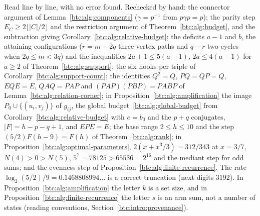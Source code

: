 \begin{writenote}
Read line by line, with no error found. Rechecked by hand: the connector
argument of Lemma~\ref{btc:alg:components} ($\gamma=p^{-1}$ from
$p\gamma p=p$); the parity step $E_C\ge2\lfloor|C|/2\rfloor$ and the
restriction argument of Theorem~\ref{btc:alg:budget}, and the subtraction
giving Corollary~\ref{btc:alg:relative-budget}; the deficits $a-1$ and $b$,
the attaining configurations ($r=m-2q$ three-vertex paths and $q-r$
two-cycles when $2q\le m<3q$) and the inequalities $2a+1\le5(a-1)$,
$2a\le4(a-1)$ for $a\ge2$ of Theorem~\ref{btc:alg:support}; the six hooks per
triple of Corollary~\ref{btc:alg:support-count}; the identities
$Q^2=Q$, $PQ=QP=Q$, $EQE=E$, $QAQ=PAP$ and $(PAP)(PBP)=PABP$ of
Lemma~\ref{btc:alg:relation-corner}; in Proposition~\ref{btc:alg:amplification}
the image $P_0\cup\{(u_i,v_j)\}$ of $g_{ij}$, the global
budget~\eqref{btc:alg:global-budget} from
Corollary~\ref{btc:alg:relative-budget} with $e=b_0$ and the $p+q$
conjugates, $|F|=h-p-q+1$, and $EPE=E$; the base range $2\le h\le10$ and the
step $(5/2)F(h-9)=F(h)$ of Theorem~\ref{btc:alg:rank}; in
Proposition~\ref{btc:alg:optimal-parameters}, $2(x+x^3/3)=312/343$ at $x=3/7$,
$N(4)>0>N(5)$, $5^7=78125>65536=2^{16}$ and the mediant step for odd sums; and
the evenness step of Proposition~\ref{btc:alg:finite-recurrence}. The rate
$\log_2(5/2)/9=0.1468808994\ldots$ is a correct truncation (next digits
$3192$). In Proposition~\ref{btc:alg:amplification} the letter $k$ is a set
size, and in Proposition~\ref{btc:alg:finite-recurrence} the letter $s$ is an
arm sum, not a number of states (reading conventions,
Section~\ref{btc:intro:provenance}).
\end{writenote}
